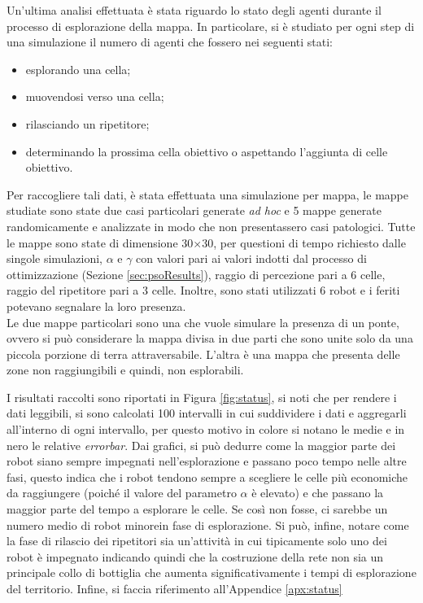 Un'ultima analisi effettuata è stata riguardo lo stato degli agenti durante il processo di esplorazione della mappa.
In particolare, si è studiato per ogni step di una simulazione il numero di agenti che fossero nei seguenti stati:
\begin{itemize}
	\item esplorando una cella;
	\item muovendosi verso una cella;
	\item rilasciando un ripetitore;
	\item determinando la prossima cella obiettivo o aspettando l'aggiunta di celle obiettivo.
\end{itemize}
Per raccogliere tali dati, è stata effettuata una simulazione per mappa, le mappe studiate sono state due casi particolari generate \textit{ad hoc} e 5 mappe generate randomicamente e analizzate in modo che non presentassero casi patologici.
Tutte le mappe sono state di dimensione 30$\times$30, per questioni di tempo richiesto dalle singole simulazioni, $\alpha$ e $\gamma$ con valori pari ai valori indotti dal processo di ottimizzazione (Sezione \ref{sec:psoResults}), raggio di percezione pari a 6 celle, raggio del ripetitore pari a 3 celle.
Inoltre, sono stati utilizzati 6 robot e i feriti potevano segnalare la loro presenza.\\
Le due mappe particolari sono una che vuole simulare la presenza di un ponte, ovvero si può considerare la mappa divisa in due parti che sono unite solo da una piccola porzione di terra attraversabile.
L'altra è una mappa che presenta delle zone non raggiungibili e quindi, non esplorabili.

I risultati raccolti sono riportati in Figura \ref{fig:status}, si noti che per rendere i dati leggibili, si sono calcolati 100 intervalli in cui suddividere i dati e aggregarli all'interno di ogni intervallo, per questo motivo in colore si notano le medie e in nero le relative \textit{errorbar}.
Dai grafici, si può dedurre come la maggior parte dei robot siano sempre impegnati nell'esplorazione e passano poco tempo nelle altre fasi, questo indica che i robot tendono sempre a scegliere le celle più economiche da raggiungere (poiché il valore del parametro $\alpha$ è elevato) e che passano la maggior parte del tempo a esplorare le celle.
Se così non fosse, ci sarebbe un numero medio di robot minorein fase di esplorazione.
Si può, infine, notare come la fase di rilascio dei ripetitori sia un'attività in cui tipicamente solo uno dei robot è impegnato indicando quindi che la costruzione della rete non sia un principale collo di bottiglia che aumenta significativamente i tempi di esplorazione del territorio.
Infine, si faccia riferimento all'Appendice \ref{apx:status}

